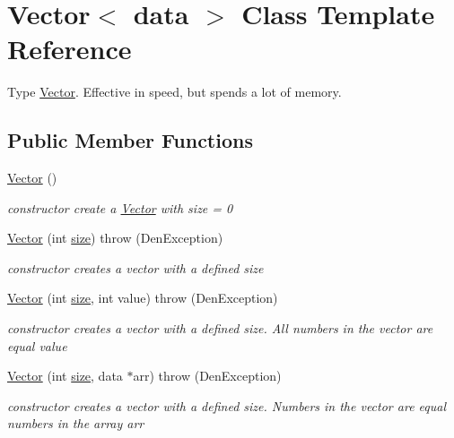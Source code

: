 \hypertarget{classVector}{}\section{Vector$<$ data $>$ Class Template Reference}
\label{classVector}


Type \hyperlink{classVector}{Vector}. Effective in speed, but spends a lot of memory.  


\subsection*{Public Member Functions}
\begin{DoxyCompactItemize}
\item 
\mbox{\label{classVector_ae1d85ad40c4838dca7b39d4083a16c8f}} 
\hyperlink{classVector_ae1d85ad40c4838dca7b39d4083a16c8f}{Vector} ()
\begin{DoxyCompactList}\small\item\em constructor  create a \hyperlink{classVector}{Vector} with size = 0 \end{DoxyCompactList}\item 
\hyperlink{classVector_aba82b0f3e3fd3d17bf2d19b04a8361b7}{Vector} (int \hyperlink{classVector_a81b1d973485244101caf8e901b4a03d9}{size})  throw (\+Den\+Exception)
\begin{DoxyCompactList}\small\item\em constructor  creates a vector with a defined size \end{DoxyCompactList}\item 
\hyperlink{classVector_aede0f97bf9e72a66047d90ad8246ded1}{Vector} (int \hyperlink{classVector_a81b1d973485244101caf8e901b4a03d9}{size}, int value)  throw (\+Den\+Exception)
\begin{DoxyCompactList}\small\item\em constructor  creates a vector with a defined size. All numbers in the vector are equal value \end{DoxyCompactList}\item 
\hyperlink{classVector_a90cdb4e859d9802e381050fa5ef7b1b7}{Vector} (int \hyperlink{classVector_a81b1d973485244101caf8e901b4a03d9}{size}, data $\ast$arr)  throw (\+Den\+Exception)
\begin{DoxyCompactList}\small\item\em constructor  creates a vector with a defined size. Numbers in the vector are equal numbers in the array arr \end{DoxyCompactList}\item 

\end{DoxyCompactItemize}
